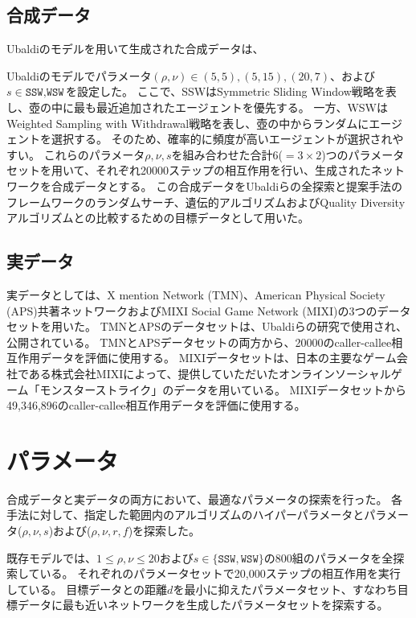 \documentclass[uplatex,11pt,openany]{ujreport}
\begin{document}
        \subsection{合成データ}
            Ubaldiのモデルを用いて生成された合成データは、

            Ubaldiのモデルでパラメータ$(\rho,\nu)\in {(5,5),(5,15),(20,7)}$、および$s\in{\texttt{SSW},\texttt{WSW}}$を設定した。
            ここで、SSWはSymmetric Sliding Window戦略を表し、壺の中に最も最近追加されたエージェントを優先する。
            一方、WSWはWeighted Sampling with Withdrawal戦略を表し、壺の中からランダムにエージェントを選択する。
            そのため、確率的に頻度が高いエージェントが選択されやすい。
            これらのパラメータ$\rho,\nu,s$を組み合わせた合計6($=3\times2$)つのパラメータセットを用いて、それぞれ20000ステップの相互作用を行い、生成されたネットワークを合成データとする。
            この合成データをUbaldiらの全探索と提案手法のフレームワークのランダムサーチ、遺伝的アルゴリズムおよびQuality Diversityアルゴリズムとの比較するための目標データとして用いた。

        \subsection{実データ}
            実データとしては、X mention Network (TMN)、American Physical Society (APS)共著ネットワークおよびMIXI Social Game Network (MIXI)の3つのデータセットを用いた。
            TMNとAPSのデータセットは、Ubaldiらの研究\cite{ubaldiEmergenceEvolutionSocial2021}で使用され、公開されている。
            TMNとAPSデータセットの両方から、20000のcaller-callee相互作用データを評価に使用する。
            MIXIデータセットは、日本の主要なゲーム会社である株式会社MIXIによって、提供していただいたオンラインソーシャルゲーム「モンスターストライク」のデータを用いている。
            MIXIデータセットから49,346,896のcaller-callee相互作用データを評価に使用する。

    \section{パラメータ}
        合成データと実データの両方において、最適なパラメータの探索を行った。
        各手法に対して、指定した範囲内のアルゴリズムのハイパーパラメータとパラメータ($\rho,\nu,s$)および($\rho,\nu,r,f$)を探索した。

        既存モデルでは、$1\leq \rho,\nu\leq20$および$s\in\{\texttt{SSW},\texttt{WSW}\}$の800組のパラメータを全探索している。
        それぞれのパラメータセットで20,000ステップの相互作用を実行している。
        目標データとの距離$d$を最小に抑えたパラメータセット、すなわち目標データに最も近いネットワークを生成したパラメータセットを探索する。
\end{document}
